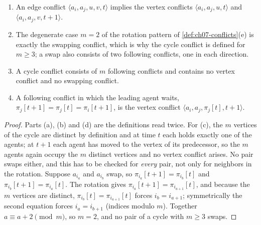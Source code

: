 \begin{proposition}
\label{prop:ch07-hierarchy}
\begin{enumerate}[label=(\alph*)]
  \item An edge conflict $\langle a_i, a_j, u, v, t\rangle$ implies the vertex
    conflicts $\langle a_i, a_j, u, t\rangle$ and $\langle a_i, a_j, v, t+1\rangle$.
  \item The degenerate case $m = 2$ of the rotation pattern of
    \cref{def:ch07-conflicts}(e) is exactly the swapping conflict, which is why
    the cycle conflict is defined for $m \ge 3$; a swap also consists of two
    following conflicts, one in each direction.
  \item A cycle conflict consists of $m$ following conflicts and contains no
    vertex conflict and no swapping conflict.
  \item A following conflict in which the leading agent waits,
    $\pi_j[t+1] = \pi_j[t] = \pi_i[t+1]$, is the vertex conflict
    $\langle a_i, a_j, \pi_j[t], t+1\rangle$.
\end{enumerate}
\end{proposition}
\begin{proof}
Parts (a), (b) and (d) are the definitions read twice. For (c), the $m$
vertices of the cycle are distinct by definition and at time $t$ each holds exactly one of
the agents; at $t+1$ each agent has moved to the vertex of its predecessor, so
the $m$ agents again occupy the $m$ distinct vertices and no vertex conflict
arises. No pair swaps either, and this has to be checked for
\emph{every} pair, not only for neighbors in the rotation. Suppose
$a_{i_a}$ and $a_{i_b}$ swap, so $\pi_{i_a}[t+1] = \pi_{i_b}[t]$ and
$\pi_{i_b}[t+1] = \pi_{i_a}[t]$. The rotation gives
$\pi_{i_a}[t+1] = \pi_{i_{a+1}}[t]$, and because the $m$ vertices are
distinct, $\pi_{i_b}[t] = \pi_{i_{a+1}}[t]$ forces $i_b = i_{a+1}$;
symmetrically the second equation forces $i_a = i_{b+1}$ (indices modulo
$m$). Together $a \equiv a + 2 \pmod m$, so $m = 2$, and no pair of a cycle
with $m \ge 3$ swaps.
\end{proof}

